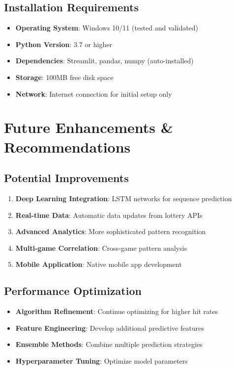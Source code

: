 \documentclass[12pt,a4paper]{article}
\begin{document}
\subsection{Installation Requirements}
\begin{itemize}
    \item \textbf{Operating System}: Windows 10/11 (tested and validated)
    \item \textbf{Python Version}: 3.7 or higher
    \item \textbf{Dependencies}: Streamlit, pandas, numpy (auto-installed)
    \item \textbf{Storage}: 100MB free disk space
    \item \textbf{Network}: Internet connection for initial setup only
\end{itemize}

\section{Future Enhancements \& Recommendations}

\subsection{Potential Improvements}
\begin{enumerate}
    \item \textbf{Deep Learning Integration}: LSTM networks for sequence prediction
    \item \textbf{Real-time Data}: Automatic data updates from lottery APIs
    \item \textbf{Advanced Analytics}: More sophisticated pattern recognition
    \item \textbf{Multi-game Correlation}: Cross-game pattern analysis
    \item \textbf{Mobile Application}: Native mobile app development
\end{enumerate}

\subsection{Performance Optimization}
\begin{itemize}
    \item \textbf{Algorithm Refinement}: Continue optimizing for higher hit rates
    \item \textbf{Feature Engineering}: Develop additional predictive features
    \item \textbf{Ensemble Methods}: Combine multiple prediction strategies
    \item \textbf{Hyperparameter Tuning}: Optimize model parameters
\end{itemize}
\end{document}
